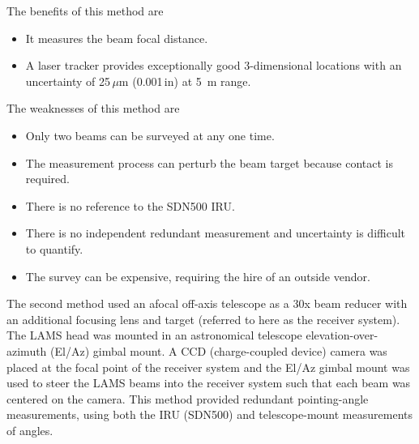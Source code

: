 \documentclass[12pt,twoside,english]{article}\usepackage[]{graphicx}\usepackage[]{color}
\begin{document}
The benefits of this method are  
\begin{itemize}
\item It measures the beam focal distance. 
\item A laser tracker provides exceptionally good 3-dimensional locations with an uncertainty of 25\,$\mu$m (0.001\,in) at 5~m range.

\end{itemize}

The weaknesses of this method are  
\begin{itemize}
\item Only two beams can be surveyed at any one time. 

\item The measurement process can perturb the beam target because
contact is required. 

\item There is no reference to the SDN500 IRU. 

\item There is no independent redundant measurement and uncertainty is difficult to quantify. 

\item The survey can be expensive, requiring the hire of an outside vendor.  
\end{itemize}







The second method used an afocal off-axis telescope as a 30x beam reducer with
an additional focusing lens and target (referred to here as the receiver
system). The LAMS head was mounted in an astronomical telescope
elevation-over-azimuth (El/Az) gimbal mount. A CCD (charge-coupled device) camera was placed at the focal 
point of the receiver system and the El/Az gimbal mount was used to steer
the LAMS beams into the receiver system such that each beam was centered on
the camera. This method provided redundant pointing-angle measurements, using
both the IRU (SDN500) and telescope-mount measurements of angles.
\end{document}
